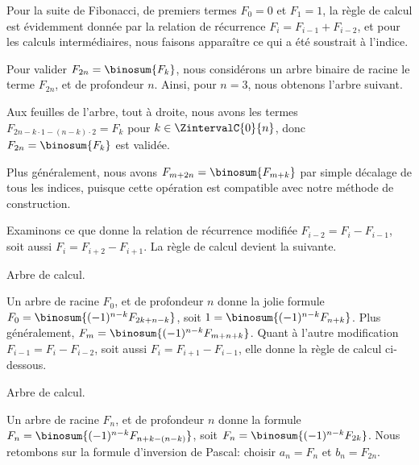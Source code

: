 Pour la suite de Fibonacci, de premiers termes $F_0 = 0$ et $F_1 = 1$, la règle de calcul est évidemment donnée par la relation de récurrence $F_{i} = F_{i-1} + F_{i-2}$,%
et pour les calculs intermédiaires, nous faisons apparaître ce qui a été soustrait à l'indice.

%
            {\intertree}{}

Pour valider $F_{2n} = \binosum{F_k}$, nous considérons un arbre binaire de racine le terme $F_{2n}$, et de profondeur $n$.
Ainsi, pour $n=3$, nous obtenons l'arbre suivant.


Aux feuilles de l'arbre, tout à droite, nous avons les termes 
$F_{2n - k\cdot1 - (n-k)\cdot2} = F_k$
pour $k \in \ZintervalC{0}{n}$,
donc
$F_{2n} = \binosum{F_k}$ est validée.


\begin{remark}
	Plus généralement, nous avons
	$F_{m+2n} = \binosum{F_{m+k}}$
	par simple décalage de tous les indices,
	puisque cette opération est compatible avec notre méthode de construction.
\end{remark}




\begin{remark}
	Examinons ce que donne la relation de récurrence modifiée $F_{i-2} = F_{i} - F_{i-1}$, soit aussi $F_i = F_{i+2} - F_{i+1}$.
	La règle de calcul devient la suivante.

    \begin{center}
    	\itshape\centering
        
    
        Arbre de calcul.
    \end{center}
    
    Un arbre de racine $F_0$, et de profondeur $n$ donne la jolie formule
    $F_{0} = \binosum{(-1)^{n-k} F_{2k + n - k}}$,
    soit
    $1 = \binosum{(-1)^{n-k} F_{n + k}}$.
    Plus généralement,
    $F_{m} = \binosum{(-1)^{n-k} F_{m + n + k}}$.
    Quant à l'autre modification $F_{i-1} = F_{i} - F_{i-2}$, soit aussi $F_i = F_{i+1} - F_{i-1}$, elle donne la règle de calcul ci-dessous.

    \begin{center}
    	\itshape\centering
        
    
        Arbre de calcul.
    \end{center}
    
    Un arbre de racine $F_n$, et de profondeur $n$ donne la formule
    $F_{n} = \binosum{(-1)^{n-k} F_{n + k - (n - k)}}$,
    soit
    $F_{n} = \binosum{(-1)^{n-k} F_{2 k}}$.
    Nous retombons sur la formule d'inversion de Pascal:
    choisir $a_n = F_n$ et $b_n = F_{2n}$. 
\end{remark}


